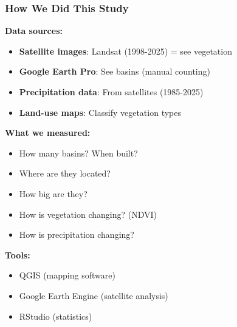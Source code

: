 \documentclass{beamer}
\begin{document}

\begin{frame}
\frametitle{How We Did This Study}

\textbf{Data sources:}
\begin{itemize}
  \item \textbf{Satellite images}: Landsat (1998-2025) = see vegetation
  \item \textbf{Google Earth Pro}: See basins (manual counting)
  \item \textbf{Precipitation data}: From satellites (1985-2025)
  \item \textbf{Land-use maps}: Classify vegetation types
\end{itemize}

\vspace{0.3cm}

\textbf{What we measured:}
\begin{itemize}
  \item How many basins? When built?
  \item Where are they located?
  \item How big are they?
  \item How is vegetation changing? (NDVI)
  \item How is precipitation changing?
\end{itemize}

\vspace{0.3cm}

\textbf{Tools:}
\begin{itemize}
  \item QGIS (mapping software)
  \item Google Earth Engine (satellite analysis)
  \item RStudio (statistics)
\end{itemize}

\end{frame}

\end{document}

